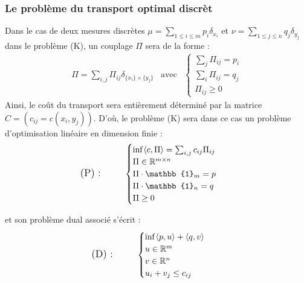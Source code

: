 \documentclass[
    8.2pt,
    a4paper,
    logo,
    twocolumn
]{template}
\begin{document}
    \subsubsection{Le problème du transport optimal discrèt}
    Dans le cas de deux mesures discrètes $\mu = \sum_{1 \leq i \leq m} p_i \delta_{x_i}$ et $\nu = \sum_{1 \leq j \leq n} q_j \delta_{y_j}$ dans le problème (K), un couplage $\Pi$ sera de la forme :
    \begin{align*}\label{eq:P}
        &\Pi = \sum_{i,j} \Pi_{ij} \delta_{\{x_i\} \times \{y_j\}} &
        \text{avec} & \begin{cases}
            \sum_{j} \Pi_{ij} = p_i \\
            \sum_{i} \Pi_{ij} = q_j \\
            \Pi_{ij} \geq 0
        \end{cases} &
    \end{align*}
    Ainsi, le coût du transport sera entièrement déterminé par la matrice $C = \left( c_{ij} = c(x_i,y_j) \right)$. D'où, le problème (K) sera dans ce cas un problème d'optimisation linéaire en dimension finie :
    \begin{align*}
        \text{\large{(P) : \qquad}} & \begin{cases}
            \inf_{} \langle c,\Pi \rangle = \sum_{i,j} c_{ij} \Pi_{ij}\\
            \Pi \in \mathbb{R}^{m \times n} \\
            \Pi \cdot \mathbb{1}_m = p \\
            \Pi \cdot \mathbb{1}_n = q \\
            \Pi \geq 0 \\
        \end{cases}
    \end{align*}

    et son problème dual associé s'écrit :
    \begin{align*}
        \text{\large{(D) : \qquad}} & \begin{cases}
            \inf_{} \langle p, u \rangle + \langle q, v \rangle\\
            u \in \mathbb{R}^m \\
            v \in \mathbb{R}^n \\
            u_i + v_j \leq c_{ij}
        \end{cases}
    \end{align*}
\end{document}
